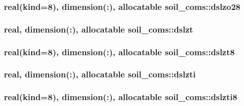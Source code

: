 \subsubsection[{\texorpdfstring{dslzo28}{dslzo28}}]{\setlength{\rightskip}{0pt plus 5cm}real(kind=8), dimension(\+:), allocatable soil\+\_\+coms\+::dslzo28}\hypertarget{namespacesoil__coms_af39809572006ef58a973b409d4dc013e}{}\label{namespacesoil__coms_af39809572006ef58a973b409d4dc013e}
\subsubsection[{\texorpdfstring{dslzt}{dslzt}}]{\setlength{\rightskip}{0pt plus 5cm}real, dimension(\+:), allocatable soil\+\_\+coms\+::dslzt}\hypertarget{namespacesoil__coms_a94ad39e6d9d5ff44b58fc26edd54e28d}{}\label{namespacesoil__coms_a94ad39e6d9d5ff44b58fc26edd54e28d}
\subsubsection[{\texorpdfstring{dslzt8}{dslzt8}}]{\setlength{\rightskip}{0pt plus 5cm}real(kind=8), dimension(\+:), allocatable soil\+\_\+coms\+::dslzt8}\hypertarget{namespacesoil__coms_a7b1c34644ae733852ef371e7764e23d1}{}\label{namespacesoil__coms_a7b1c34644ae733852ef371e7764e23d1}
\subsubsection[{\texorpdfstring{dslzti}{dslzti}}]{\setlength{\rightskip}{0pt plus 5cm}real, dimension(\+:), allocatable soil\+\_\+coms\+::dslzti}\hypertarget{namespacesoil__coms_af5edf2523e90d608f848782aad517da2}{}\label{namespacesoil__coms_af5edf2523e90d608f848782aad517da2}
\subsubsection[{\texorpdfstring{dslzti8}{dslzti8}}]{\setlength{\rightskip}{0pt plus 5cm}real(kind=8), dimension(\+:), allocatable soil\+\_\+coms\+::dslzti8}\hypertarget{namespacesoil__coms_ad8c0bc69f2eebddc89763e0789953239}{}\label{namespacesoil__coms_ad8c0bc69f2eebddc89763e0789953239}
